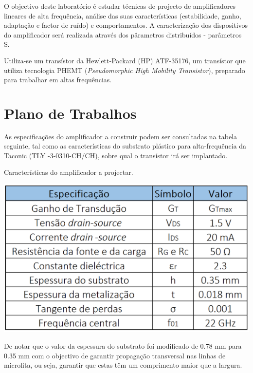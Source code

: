 \documentclass[11pt]{article}
\numberwithin{equation}{section}
\begin{document}

O objectivo deste laboratório é estudar técnicas de projecto de amplificadores lineares de alta frequência, análise das suas características (estabilidade, ganho, adaptação e factor de ruído) e comportamentos. A caracterização dos dispositivos do amplificador será realizada através dos pârametros distribuídos - parâmetros S.

Utiliza-se um transístor da Hewlett-Packard (HP) ATF-35176, um transístor que utiliza tecnologia PHEMT (\textit{Pseudomorphic High Mobility Transistor}), preparado para trabalhar em altas frequências.

\section{Plano de Trabalhos}
\label{sec:Pla_Trab}

As especificações do amplificador a construir podem ser consultadas na tabela seguinte, tal como as características do substrato plástico para alta-frequência da Taconic (TLY -3-0310-CH/CH), sobre qual o transístor irá ser implantado. 

\begin{table}[H]
	\centering
	\caption{Características do amplificador a projectar.}
	\vspace{-1.5mm}
	\includegraphics[keepaspectratio=true, scale=0.40]{teoricas/table1}
	\label{tab:car}
\end{table}

De notar que o valor da espessura do substrato foi modificado de 0.78 mm para 0.35 mm com o objectivo de garantir propagação transversal nas linhas de microfita, ou seja, garantir que estas têm um comprimento maior que a largura. 
\end{document}
